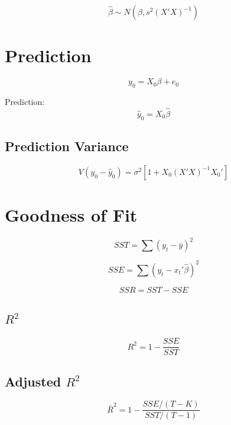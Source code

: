 \[
\hat{\beta} \sim N\left(\beta, s^2 (X'X)^{-1}\right)
\]

\section{Prediction}

\[
y_0 = X_0 \beta + e_0
\]

Prediction:
\[
\hat{y}_0 = X_0 \hat{\beta}
\]

\subsection{Prediction Variance}

\[
V(y_0 - \hat{y}_0) = \sigma^2 \left[1 + X_0 (X'X)^{-1} X_0'\right]
\]

\section{Goodness of Fit}

\[
SST = \sum (y_t - \bar{y})^2
\]

\[
SSE = \sum (y_t - x_t'\hat{\beta})^2
\]

\[
SSR = SST - SSE
\]

\subsection{$R^2$}

\[
R^2 = 1 - \frac{SSE}{SST}
\]

\subsection{Adjusted $R^2$}

\[
\bar{R}^2 = 1 - \frac{SSE/(T-K)}{SST/(T-1)}
\]